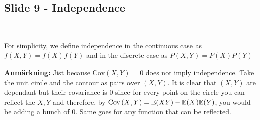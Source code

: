 \subsection{Slide 9 - Independence}\hfill\\
\par\bigskip
\noindent For simplicity, we define independence in the continuous case as $f(X,Y) = f(X)f(Y)$ and in the discrete case as $P(X,Y) = P(X)P(Y)$
\par\bigskip
\noindent\textbf{Anmärkning:} Jist because $\text{Cov}\left(X,Y\right)=0$ does not imply independence. Take the unit circle and the contour as pairs over $(X,Y)$. It is clear that $(X,Y)$ are dependant but their covariance is 0 since for every point on the circle you can reflect the $X,Y$ and therefore, by $\text{Cov}\left(X,Y\right) = \mathbb{E}(XY)-\mathbb{E}(X)\mathbb{E}(Y)$, you would be adding a bunch of 0. Same goes for any function that can be reflected.
\par\bigskip
